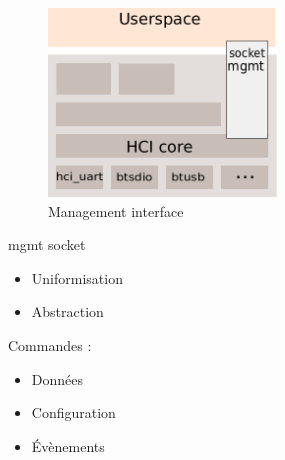 \begin{frame}
\begin{minipage}[t]{0.60\linewidth}
	\begin{figure}
		\includegraphics[height=5cm]{bluez_kernel_hci_sock.png}
		\caption{Management interface}
	\end{figure}
\end{minipage}
\begin{minipage}[t]{0.30\linewidth}
	\begin{block}{mgmt socket}
		\begin{itemize}
			\item Uniformisation
			\item Abstraction
		\end{itemize}
		Commandes : 
		\begin{itemize}
			\item Données
			\item Configuration
			\item Évènements
		\end{itemize}
	\end{block}
\end{minipage}
\end{frame}

